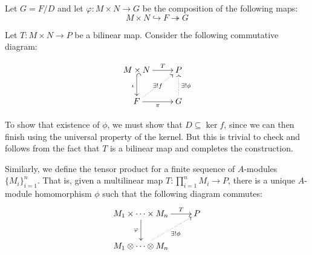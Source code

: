Let $G = F/D$ and let $\varphi: M\times N\to G$ be the composition of the following maps: 
\begin{equation*}
    M\times N\hookrightarrow F\twoheadrightarrow G
\end{equation*}

Let $T: M\times N\to P$ be a bilinear map. Consider the following commutative diagram: 

\begin{equation*}
\xymatrix {
    M\times N\ar[r]^-T\ar@{^{(}->}_{\iota}[d] & P\\
    F\ar[r]_{\pi}\ar@{.>}[ru]|{\exists! f} & G\ar@{.>}[u]_{\exists!\phi}
}
\end{equation*}

To show that existence of $\phi$, we must show that $D\subseteq\ker f$, since we can then finish using the universal property of the kernel. But this is trivial to check and follows from the fact that $T$ is a bilinear map and completes the construction.

\begin{mdframed}
    Similarly, we define the tensor product for a finite sequence of $A$-modules $\{M_i\}_{i = 1}^n$. That is, given a multilinear map $T:\prod\limits_{i = 1}^n M_i\to P$, there is a unique $A$-module homomorphism $\phi$ such that the following diagram commutes: 
    \begin{equation*}
    \xymatrix{
        M_1\times\cdots\times M_n\ar[r]^-T\ar[d]_\varphi & P\\
        M_1\otimes\cdots\otimes M_n\ar@{.>}[ru]_-{\exists!\phi}
    }
    \end{equation*}
\end{mdframed}

